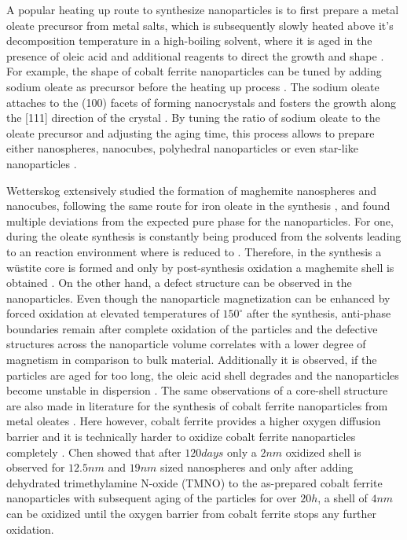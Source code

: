 \documentclass[\main/dresen_thesis.tex]{subfiles}
\begin{document}
  A popular heating up route to synthesize nanoparticles is to first prepare a metal oleate precursor from metal salts, which is subsequently slowly heated above it's decomposition temperature in a high-boiling solvent, where it is aged in the presence of oleic acid and additional reagents to direct the growth and shape \cite{Park_2004_Ultra, Wetterskog_2014_Preci}.
  For example, the shape of cobalt ferrite nanoparticles can be tuned by adding sodium oleate as precursor before the heating up process \cite{Bodnarchuk_2009_Excha}.
  The sodium oleate attaches to the (100) facets of forming nanocrystals and fosters the growth along the [111] direction of the crystal \cite{Bodnarchuk_2009_Excha}.
  By tuning the ratio of sodium oleate to the oleate precursor and adjusting the aging time, this process allows to prepare either nanospheres, nanocubes, polyhedral nanoparticles or even star-like nanoparticles \cite{Bodnarchuk_2009_Excha, Bao_2009_Forma, Wetterskog_2014_Preci}.

  Wetterskog \etal extensively studied the formation of maghemite nanospheres and nanocubes, following the same route for iron oleate in the synthesis \cite{Wetterskog_2014_Preci, Wetterskog_2013_Anoma}, and found multiple deviations from the expected pure phase for the nanoparticles.
  For one, during the oleate synthesis  is constantly being produced from the solvents leading to an reaction environment where  is reduced to  \cite{Hai_2010_Sizec}.
  Therefore, in the synthesis a w\"ustite core is formed and only by post-synthesis oxidation a maghemite shell is obtained \cite{Wetterskog_2013_Anoma}.
  On the other hand, a defect structure can be observed in the nanoparticles.
  Even though the nanoparticle magnetization can be enhanced by forced oxidation at elevated temperatures of $150^\circ$ after the synthesis, anti-phase boundaries remain after complete oxidation of the particles \cite{Wetterskog_2013_Anoma} and the defective structures across the nanoparticle volume correlates with a lower degree of magnetism in comparison to bulk material.
  Additionally it is observed, if the particles are aged for too long, the oleic acid shell degrades and the nanoparticles become unstable in dispersion \cite{Wetterskog_2013_Anoma}.
  The same observations of a core-shell structure are also made in literature for the synthesis of cobalt ferrite nanoparticles from metal oleates \cite{Bodnarchuk_2009_Excha}.
  Here however, cobalt ferrite provides a higher oxygen diffusion barrier and it is technically harder to oxidize cobalt ferrite nanoparticles completely \cite{Chen_2015_Synth}.
  Chen \etal \cite{Chen_2015_Synth} showed that after $120 \unit{days}$ only a $2 \unit{nm}$ oxidized shell is observed for $12.5 \unit{nm}$ and $19 \unit{nm}$ sized nanospheres and only after adding dehydrated trimethylamine N-oxide (TMNO) to the as-prepared cobalt ferrite nanoparticles with subsequent aging of the particles for over $20 \unit{h}$, a shell of $4 \unit{nm}$ can be oxidized until the oxygen barrier from cobalt ferrite stops any further oxidation.
\end{document}

